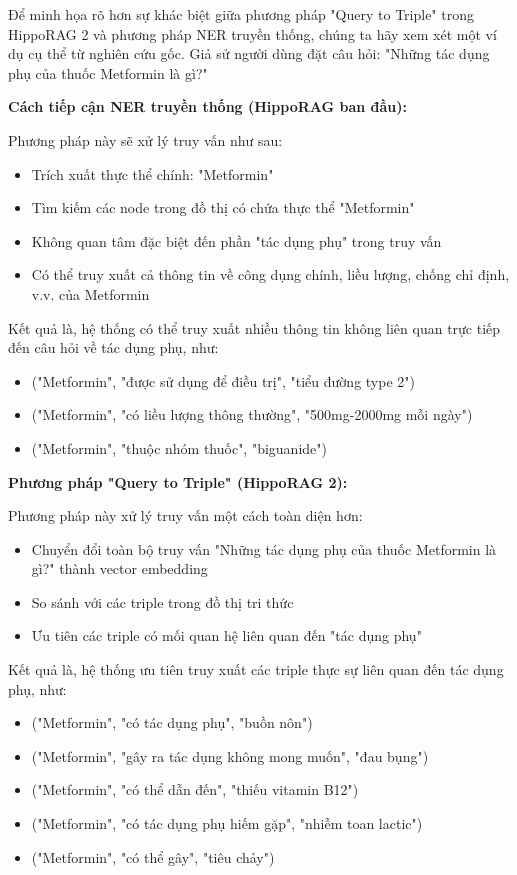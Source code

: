 \documentclass[../main.tex]{subfiles}
\begin{document}
Để minh họa rõ hơn sự khác biệt giữa phương pháp "Query to Triple" trong HippoRAG 2 và phương pháp NER truyền thống, chúng ta hãy xem xét một ví dụ cụ thể từ nghiên cứu gốc. Giả sử người dùng đặt câu hỏi: "Những tác dụng phụ của thuốc Metformin là gì?"

\textbf{Cách tiếp cận NER truyền thống (HippoRAG ban đầu):}

Phương pháp này sẽ xử lý truy vấn như sau:
\begin{itemize}
    \item Trích xuất thực thể chính: "Metformin"
    \item Tìm kiếm các node trong đồ thị có chứa thực thể "Metformin"
    \item Không quan tâm đặc biệt đến phần "tác dụng phụ" trong truy vấn
    \item Có thể truy xuất cả thông tin về công dụng chính, liều lượng, chống chỉ định, v.v. của Metformin
\end{itemize}

Kết quả là, hệ thống có thể truy xuất nhiều thông tin không liên quan trực tiếp đến câu hỏi về tác dụng phụ, như:
\begin{itemize}
    \item ("Metformin", "được sử dụng để điều trị", "tiểu đường type 2")
    \item ("Metformin", "có liều lượng thông thường", "500mg-2000mg mỗi ngày")
    \item ("Metformin", "thuộc nhóm thuốc", "biguanide")
\end{itemize}

\textbf{Phương pháp "Query to Triple" (HippoRAG 2):}

Phương pháp này xử lý truy vấn một cách toàn diện hơn:
\begin{itemize}
    \item Chuyển đổi toàn bộ truy vấn "Những tác dụng phụ của thuốc Metformin là gì?" thành vector embedding
    \item So sánh với các triple trong đồ thị tri thức
    \item Ưu tiên các triple có mối quan hệ liên quan đến "tác dụng phụ"
\end{itemize}

Kết quả là, hệ thống ưu tiên truy xuất các triple thực sự liên quan đến tác dụng phụ, như:
\begin{itemize}
    \item ("Metformin", "có tác dụng phụ", "buồn nôn")
    \item ("Metformin", "gây ra tác dụng không mong muốn", "đau bụng")
    \item ("Metformin", "có thể dẫn đến", "thiếu vitamin B12")
    \item ("Metformin", "có tác dụng phụ hiếm gặp", "nhiễm toan lactic")
    \item ("Metformin", "có thể gây", "tiêu chảy")
\end{itemize}
\end{document}
